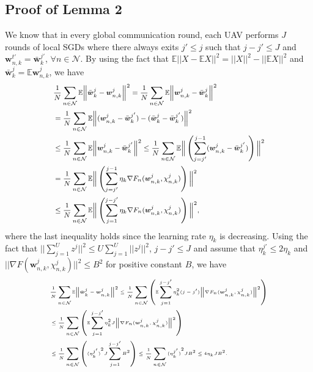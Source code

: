 \subsection{Proof of Lemma 2}
\label{Lemma_lemma2:upperbound}
We know that in every global communication round, each UAV performs $J$ rounds of local SGDs where there always exits $j' \leq j$ such that $j-j'\leq J$ and $\boldsymbol{w}_{n,k}^{t'} = \bar{\boldsymbol{w}}_k^{j'}$, $\forall n \in \mathcal{N}$. By using the fact that $\mathbb{E}||X-\mathbb{E}X||^2 = ||X||^2 - ||\mathbb{E}X||^2$ and $\bar{\boldsymbol{w}}_k^j =\mathbb{E}\boldsymbol{w}_{n,k}^j$, we have
\begin{equation} 
\footnotesize
\begin{aligned}
&  \frac{1}{N}\sum_{n\in\mathcal{N}} \mathbb{E} \Big\Vert\bar{\boldsymbol{w}}_k^j-\boldsymbol{w}_{n,k}^j\Big\Vert^2 
= \frac{1}{N}\sum_{n\in\mathcal{N}} \mathbb{E} \Big\Vert\boldsymbol{w}_{n,k}^j - \bar{\boldsymbol{w}}_k^j\Big\Vert^2 
\\&=\frac{1}{N}\sum_{n\in\mathcal{N}}\mathbb{E} \Big\Vert(\boldsymbol{w}_{n,k}^j - \bar{\boldsymbol{w}}_k^{j'}) - (\bar{\boldsymbol{w}}_k^j-\bar{\boldsymbol{w}}_k^{j'}) \Big\Vert^2 
\\&\leq  \frac{1}{N}\sum_{n\in\mathcal{N}} \mathbb{E} \Big\Vert\boldsymbol{w}_{n,k}^j - \bar{\boldsymbol{w}}_k^{j'}\Big\Vert^2  
\leq   \frac{1}{N}\sum_{n\in\mathcal{N}}\mathbb{E}\Big\Vert\left(\sum_{j=j'}^{j-1} (\boldsymbol{w}_{n,k}^j-\bar{\boldsymbol{w}}_k^{j'}) \right) \Big\Vert^2  
\\&=   \frac{1}{N}\sum_{n\in\mathcal{N}}\mathbb{E}\Big\Vert\left(\sum_{j=j'}^{j-1} \eta_k \nabla F_{n}(\boldsymbol{w}_{n,k}^j,\chi_{n,k}^j) \right) \Big\Vert^2 
\\&\leq \frac{1}{N}\sum_{n\in\mathcal{N}}\mathbb{E} \Big\Vert\left(\sum_{j=1}^{j-j'} \eta_k \nabla F_{n}(\boldsymbol{w}_{n,k}^j,\chi_{n,k}^j) \right) \Big\Vert^2  ,
\end{aligned}
\end{equation}
where the last inequality holds since the learning rate $\eta_k$ is decreasing. Using the fact that $||\sum_{j=1}^{U} z^j||^2 \leq U\sum_{j=1}^{U} ||z^j||^2$, $j-j' \leq J$ and assume that $\eta_k^{j'} \leq 2\eta_k$ and $||\nabla F(\boldsymbol{w}_{n,k}^j,\chi_{n,k}^j)||^2 \leq B^2$ for positive constant $B$, we have
\begin{equation} 
\tiny
\begin{aligned}
&  \frac{1}{N}\sum_{n\in\mathcal{N}} \mathbb{E} \Big\Vert\bar{\boldsymbol{w}}_k^j-\boldsymbol{w}_{n,k}^j\Big\Vert^2  
\leq  \frac{1}{N}\sum_{n\in\mathcal{N}}\left( \mathbb{E} \sum_{j=1}^{j-j'} \eta_k^2(j-j')  \Big\Vert \nabla F_{n}(\boldsymbol{w}_{n,k}^j,\chi_{n,k}^j)\Big\Vert^2 \right) 
\\&\leq  \frac{1}{N}\sum_{n\in\mathcal{N}}\left( \mathbb{E} \sum_{j=1}^{j-j'} \eta_k^2J \Big\Vert\nabla F_{n}(\boldsymbol{w}_{n,k}^j,\chi_{n,k}^j)\Big\Vert^2 \right) 
\\&\leq  \frac{1}{N}\sum_{n\in\mathcal{N}}\left({(\eta_k^{j'})}^2J  \sum_{j=1}^{j-j'}  B^2 \right) 
\leq  \frac{1}{N}\sum_{n\in\mathcal{N}} {(\eta_k^{j'})}^2J B^2 \leq  4\eta_kJ B^2.
\end{aligned}
\end{equation}
